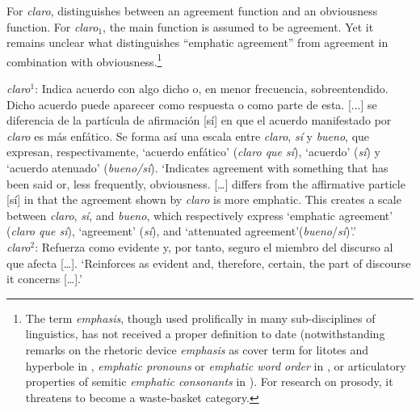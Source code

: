 For \textit{claro}, \citet{PonsBorderia.2011} distinguishes between an agreement function and an obviousness function. For \textit{claro}$_1$, the main function is assumed to be agreement. Yet it remains unclear what distinguishes ``emphatic agreement'' from agreement in combination with obviousness.\footnote{The term \textit{emphasis}, though used prolifically in many sub-disciplines of linguistics,  has not received a proper definition to date (notwithstanding remarks on the rhetoric device \textit{emphasis} as cover term for litotes and hyperbole in \cite[358]{Bussmann.2006}, \textit{emphatic pronouns} or \textit{emphatic word order} in \cite[151]{BrownMiller.2013}, or articulatory properties of semitic \textit{emphatic consonants} in \cite[167]{Crystal.2008}). For research on prosody, it threatens to become a waste-basket category.}\largerpage

\begin{displayquote}
	\textit{claro}$^1$: Indica acuerdo con algo dicho o, en menor frecuencia, sobreentendido. Dicho acuerdo puede aparecer como respuesta o como parte de esta. [...] se diferencia de la partícula de afirmación [sí] en que el acuerdo manifestado por \textit{claro} es más enfático. Se forma así una escala entre \textit{claro}, \textit{sí} y \textit{bueno}, que expresan, respectivamente, `acuerdo enfático' (\textit{claro que sí}), `acuerdo' (\textit{sí}) y `acuerdo atenuado' (\textit{bueno/sí}).  \citep{PonsBorderia.2011}\pagebreak
	\glt `Indicates agreement with something that has been said or, less frequently, obviousness. [\ldots] differs from the affirmative particle [sí] in that the agreement shown by \textit{claro} is more emphatic. This creates a scale between \textit{claro}, \textit{sí}, and \textit{bueno}, which respectively express `emphatic agreement' (\textit{claro que sí}), `agreement' (\textit{sí}), and `attenuated agreement'(\textit{bueno}/\textit{sí})'.'\medskip\\
	\textit{claro}$^2$: Refuerza como evidente y, por tanto, seguro el miembro del discurso al que afecta  [\ldots]. \citep{PonsBorderia.2011claro2}
	\glt `Reinforces as evident and, therefore, certain, the part of discourse it concerns [\ldots].'
\end{displayquote}

